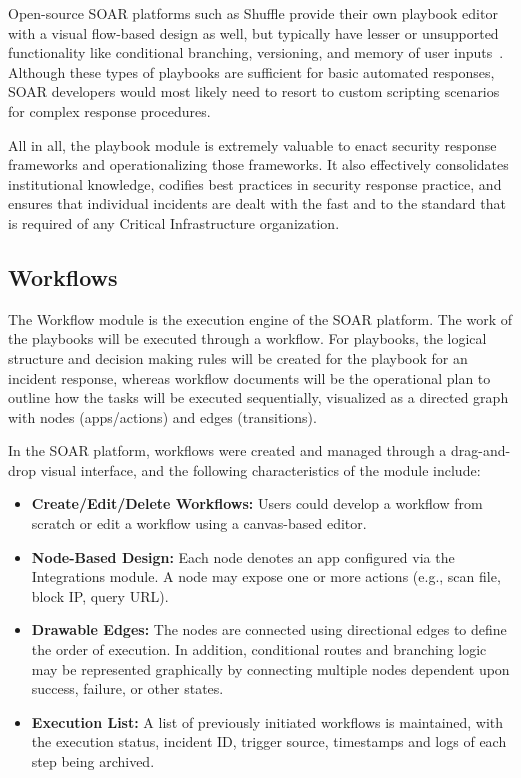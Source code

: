 Open-source SOAR platforms such as Shuffle provide their own playbook editor with a visual flow-based design as well, but typically have lesser or unsupported functionality like conditional branching, versioning, and memory of user inputs~\cite{techtarget}. Although these types of playbooks are sufficient for basic automated responses, SOAR developers would most likely need to resort to custom scripting scenarios for complex response procedures.

All in all, the playbook module is extremely valuable to enact security response frameworks and operationalizing those frameworks. It also effectively consolidates institutional knowledge, codifies best practices in security response practice, and ensures that individual incidents are dealt with the fast and to the standard that is required of any Critical Infrastructure organization.

\subsection{Workflows}

The Workflow module is the execution engine of the SOAR platform. The work of the playbooks will be executed through a workflow. For playbooks, the logical structure and decision making rules will be created for the playbook for an incident response, whereas workflow documents will be the operational plan to outline how the tasks will be executed sequentially, visualized as a directed graph with nodes (apps/actions) and edges (transitions).

In the SOAR platform, workflows were created and managed through a drag-and-drop visual interface, and the following characteristics of the module include:

\begin{itemize}[noitemsep,topsep=0pt]
    \item \textbf{Create/Edit/Delete Workflows:} Users could develop a workflow from scratch or edit a workflow using a canvas-based editor.
    
    \item \textbf{Node-Based Design:} Each node denotes an app configured via the Integrations module. A node may expose one or more actions (e.g., scan file, block IP, query URL).
    
    \item \textbf{Drawable Edges:} The nodes are connected using directional edges to define the order of execution. In addition, conditional routes and branching logic may be represented graphically by connecting multiple nodes dependent upon success, failure, or other states.
    
    \item \textbf{Execution List:} A list of previously initiated workflows is maintained, with the execution status, incident ID, trigger source, timestamps and logs of each step being archived.
\end{itemize}

